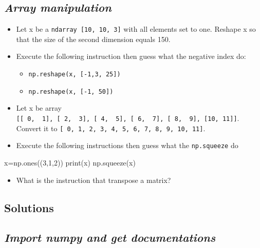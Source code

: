 \documentclass[11pt]{article}
\providecommand{\tightlist}{%
      \setlength{\itemsep}{0pt}\setlength{\parskip}{0pt}}
\newenvironment{Shaded}{}{}
\newcommand{\DecValTok}[1]{\textcolor[rgb]{0.25,0.63,0.44}{{#1}}}
\newcommand{\NormalTok}[1]{{#1}}
\newcommand{\OperatorTok}[1]{\textcolor[rgb]{0.40,0.40,0.40}{{#1}}}
\newcommand{\BuiltInTok}[1]{{#1}}
\begin{document}
  \hypertarget{array-manipulation}{%
  \subsection{\texorpdfstring{\emph{Array
  manipulation}}{Array manipulation}}\label{array-manipulation}}

  \begin{itemize}
  \tightlist
  \item
    Let x be a \texttt{ndarray\ {[}10,\ 10,\ 3{]}} with all elements set
    to one. Reshape x so that the size of the second dimension equals
    150.
  \item
    Execute the following instruction then guess what the negative index do:

    \begin{itemize}
    \tightlist
    \item
      \texttt{np.reshape(x,\ {[}-1,3,\ 25{]})}
    \item
      \texttt{np.reshape(x,\ {[}-1,\ 50{]})}
    \end{itemize}
  \item
    Let x be array
    \texttt{{[}{[}\ 0,\ \ 1{]},\ {[}\ 2,\ \ 3{]},\ {[}\ 4,\ \ 5{]},\ {[}\ 6,\ \ 7{]},\ {[}\ 8,\ \ 9{]},\ {[}10,\ 11{]}{]}}.
    Convert it to
    \texttt{{[}\ 0,\ 1,\ 2,\ 3,\ 4,\ 5,\ 6,\ 7,\ 8,\ 9,\ 10,\ 11{]}}.
  \item
    Execute the following instructions then guess what the
    \texttt{np.squeeze} do
  \end{itemize}

\begin{Shaded}
\begin{tcolorbox}[breakable, size=fbox, boxrule=1pt, pad at break*=1mm,colback=cellbackground, colframe=cellborder]
  \begin{Highlighting}[]
\NormalTok{x}\OperatorTok{=}\NormalTok{np.ones((}\DecValTok{3}\NormalTok{,}\DecValTok{1}\NormalTok{,}\DecValTok{2}\NormalTok{))}
\BuiltInTok{print}\NormalTok{(x)}
\NormalTok{np.squeeze(x)}
\end{Highlighting}
\end{tcolorbox}
\end{Shaded}

  \begin{itemize}
  \tightlist
  \item
    What is the instruction that transpose a matrix?
  \end{itemize}

  \hypertarget{solutions}{%
\subsection*{Solutions}\label{solutions}}
\setcounter{subsection}{0}
  \hypertarget{import-numpy-and-get-documentations}{%
  \subsection{\texorpdfstring{\emph{Import numpy and get
  documentations}}{Import numpy and get documentations}}\label{import-numpy-and-get-documentations}}
\end{document}
